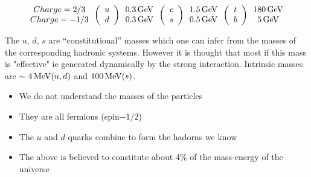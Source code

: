 \[
  \begin{array}{ccccccc}
    \begin{array}{c}
    Charge =  2/3 \\
    Charge = -1/3
    \end{array}
    
  \left(
    \begin{array}{c}
    u \\
    d
    \end{array}
  \right)
  
    \begin{array}{c}
    0.3 \mathrm{\,GeV} \\
    0.3 \mathrm{\,GeV}
    \end{array}
  
  \left(
    \begin{array}{c}
    c \\
    s 
    \end{array}
  \right)
  
    \begin{array}{c}
    1.5 \mathrm{\,GeV} \\
    0.5 \mathrm{\,GeV}
    \end{array}
  
  \left(
    \begin{array}{c}
    t \\
    b
    \end{array}
  \right)
  
    \begin{array}{c}
    180 \mathrm{\,GeV} \\
    5 \mathrm{\,GeV}
    \end{array}
  \end{array}
\]

The $u$, $d$, $s$ are ``constitutional'' masses which one can infer from the masses of the corresponding hadronic systems.  However it is thought that most if this mass is "effective" ie generated dynamically by the strong interaction.  Intrinsic masses are $\sim 4\mathrm{\,MeV} (u,d)$ and $100\mathrm{\,MeV}(s)$.

\begin{itemize}
  \item We do not understand the masses of the particles
  \item They are all fermions (spin$-1/2$)
  \item The $u$ and $d$ quarks combine to form the hadorns we know
  \item The above is believed to constitute about 4\% of the mass-energy of the universe
\end{itemize}

